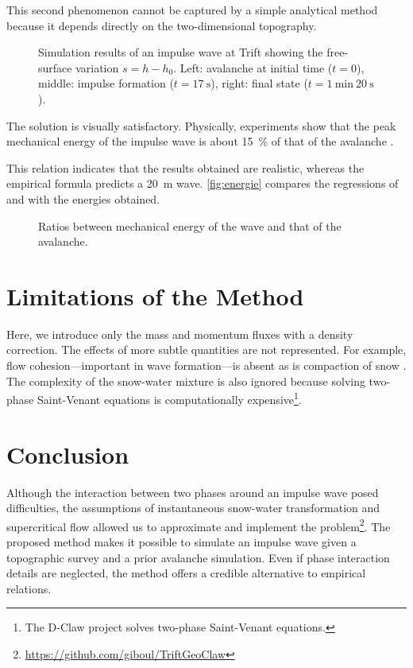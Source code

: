 \documentclass[11pt]{article}
\begin{document}
This second phenomenon cannot be captured by a simple analytical method because it depends directly on the two-dimensional topography.

\begin{figure}
    \centering
    
    \caption{Simulation results of an impulse wave at Trift showing the free-surface variation $s=h-h_0$.
    Left: avalanche at initial time ($t=0$),
    middle: impulse formation ($t=\SI{17}{\second}$),
    right: final state ($t=\SI{1}{\minute}~\SI{20}{\second}$).}
    \label{fig:Trift}
\end{figure}

The solution is visually satisfactory.
Physically, experiments show that the peak mechanical energy of the impulse wave is about \SI{15}{\percent} of that of the avalanche \citep{zitti,zhenzu}.

This relation indicates that the results obtained are realistic, whereas the empirical formula predicts a \SI{20}{\meter} wave.
\autoref{fig:energie} compares the regressions of \cite{zitti} and \cite{zhenzu} with the energies obtained.

\begin{figure}
    \centering
    \resizebox{0.8\textwidth}{!}{}
    \caption{Ratios between mechanical energy of the wave and that of the avalanche.}
    \label{fig:energie}
\end{figure}

\section{Limitations of the Method}

Here, we introduce only the mass and momentum fluxes with a density correction. The effects of more subtle quantities are not represented. For example, flow cohesion—important in wave formation—is absent \citep{zhenzu} as is compaction of snow \citep{kyburz}.
The complexity of the snow-water mixture is also ignored because solving two-phase Saint-Venant equations is computationally expensive\footnote{
The D-Claw project \citep{dclaw} solves two-phase Saint-Venant equations.
}.

\section{Conclusion}

Although the interaction between two phases around an impulse wave posed difficulties,
the assumptions of instantaneous snow-water transformation and supercritical flow allowed us to approximate and implement the problem\footnote{\href{https://github.com/giboul/TriftGeoClaw}{https://github.com/giboul/TriftGeoClaw}}.
The proposed method makes it possible to simulate an impulse wave given a topographic survey and a prior avalanche simulation.
Even if phase interaction details are neglected, the method offers a credible alternative to empirical relations.

\clearpage


\end{document}
